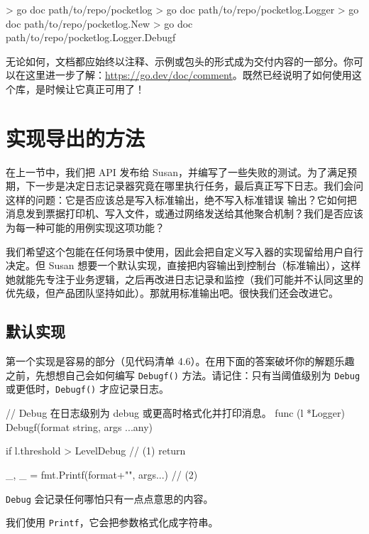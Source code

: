 \begin{shellcode}[]
> go doc path/to/repo/pocketlog
> go doc path/to/repo/pocketlog.Logger
> go doc path/to/repo/pocketlog.New
> go doc path/to/repo/pocketlog.Logger.Debugf
\end{shellcode}
无论如何，文档都应始终以注释、示例或包头的形式成为交付内容的一部分。你可以在这里进一步了解：\url{https://go.dev/doc/comment}。既然已经说明了如何使用这个库，是时候让它真正可用了！

\section{实现导出的方法}

在上一节中，我们把 API 发布给 Susan，并编写了一些失败的测试。为了满足预期，下一步是决定日志记录器究竟在哪里执行任务，最后真正写下日志。我们会问这样的问题：它是否应该总是写入标准输出，绝不写入标准错误
输出？它如何把消息发到票据打印机、写入文件，或通过网络发送给其他聚合机制？我们是否应该为每一种可能的用例实现这项功能？

我们希望这个包能在任何场景中使用，因此会把自定义写入器的实现留给用户自行决定。但 Susan 想要一个默认实现，直接把内容输出到控制台（标准输出），这样她就能先专注于业务逻辑，之后再改进日志记录和监控（我们可能并不认同这里的优先级，但产品团队坚持如此）。那就用标准输出吧。很快我们还会改进它。

\subsection{默认实现}

第一个实现是容易的部分（见代码清单 4.6）。在用下面的答案破坏你的解题乐趣之前，先想想自己会如何编写 \texttt{Debugf()} 方法。请记住：只有当阈值级别为 \texttt{Debug} 或更低时，\texttt{Debugf()} 才应记录日志。

\begin{gocode}[title={代码清单 4.6 logger.go：控制台的默认 Debugf 实现}]
// Debug 在日志级别为 debug 或更高时格式化并打印消息。
func (l *Logger) Debugf(format string, args ...any) {
    if l.threshold > LevelDebug { // (1)
        return
    }

    _, _ = fmt.Printf(format+"\n", args...) // (2)
}
\end{gocode}

\begin{codeannotations}
  \item \texttt{Debug} 会记录任何哪怕只有一点点意思的内容。
  \item 我们使用 \texttt{Printf}，它会把参数格式化成字符串。
\end{codeannotations}

